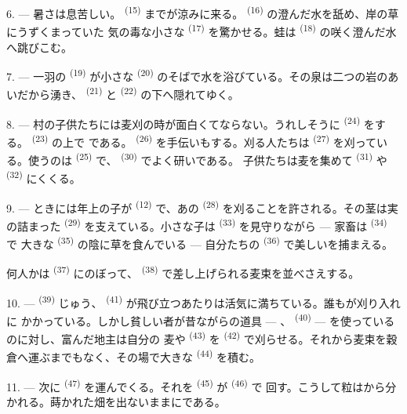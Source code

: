 6. --- 暑さは息苦しい。 \textsuperscript{(15)} までが涼みに来る。
 \textsuperscript{(16)} の澄んだ水を舐め、岸の草にうずくまっていた
気の毒な小さな \textsuperscript{(17)} を驚かせる。蛙は
\textsuperscript{(18)} の咲く澄んだ水へ跳びこむ。

7. --- 一羽の \textsuperscript{(19)} が小さな
\textsuperscript{(20)} のそばで水を浴びている。その泉は二つの岩のあいだから湧き、
 \textsuperscript{(21)} と \textsuperscript{(22)}
の下へ隠れてゆく。

\VUsaut{5.0mm}
\VUsaut{3.4mm}

8. --- 村の子供たちには麦刈の時が面白くてならない。うれしそうに \textsuperscript{(24)} をする。 \textsuperscript{(23)} の上で
である。 \textsuperscript{(26)} を手伝いもする。刈る人たちは
 \textsuperscript{(27)} を刈っている。使うのは
\textsuperscript{(25)} で、 \textsuperscript{(30)} でよく研いである。
子供たちは麦を集めて \textsuperscript{(31)} や
\textsuperscript{(32)} にくくる。

9. --- ときには年上の子が \textsuperscript{(12)} で、あの
 \textsuperscript{(28)} を刈ることを許される。その茎は実の詰まった
 \textsuperscript{(29)} を支えている。小さな子は
\textsuperscript{(33)} を見守りながら --- 家畜は \textsuperscript{(34)} で
大きな \textsuperscript{(35)} の陰に草を食んでいる ---
自分たちの \textsuperscript{(36)} で美しいを捕まえる。

何人かは \textsuperscript{(37)} にのぼって、
\textsuperscript{(38)} で差し上げられる麦束を並べさえする。

10. ---  \textsuperscript{(39)} じゅう、
\textsuperscript{(41)} が飛び立つあたりは活気に満ちている。誰もが刈り入れに
かかっている。しかし貧しい者が昔ながらの道具 --- 、
 \textsuperscript{(40)} --- を使っているのに対し、富んだ地主は自分の
麦や \textsuperscript{(43)} を \textsuperscript{(42)}
で刈らせる。それから麦束を穀倉へ運ぶまでもなく、その場で大きな
\textsuperscript{(44)} を積む。

11. --- 次に \textsuperscript{(47)} を運んでくる。それを
 \textsuperscript{(45)} が \textsuperscript{(46)} で
回す。こうして粒はから分かれる。蒔かれた畑を出ないままにである。

